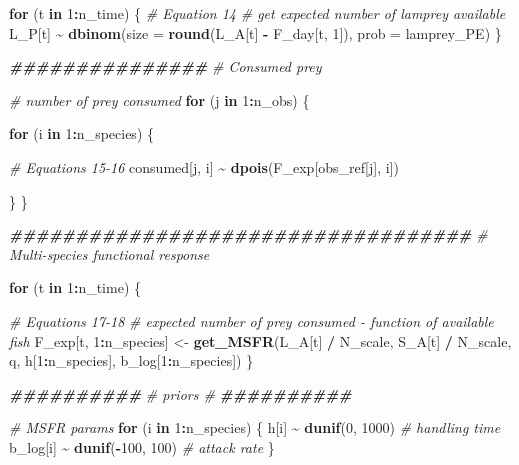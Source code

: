 \documentclass[
]{article}
\newenvironment{Shaded}{\begin{snugshade}}{\end{snugshade}}
\newcommand{\AttributeTok}[1]{\textcolor[rgb]{0.13,0.29,0.53}{#1}}
\newcommand{\CommentTok}[1]{\textcolor[rgb]{0.56,0.35,0.01}{\textit{#1}}}
\newcommand{\ControlFlowTok}[1]{\textcolor[rgb]{0.13,0.29,0.53}{\textbf{#1}}}
\newcommand{\DecValTok}[1]{\textcolor[rgb]{0.00,0.00,0.81}{#1}}
\newcommand{\DocumentationTok}[1]{\textcolor[rgb]{0.56,0.35,0.01}{\textbf{\textit{#1}}}}
\newcommand{\FunctionTok}[1]{\textcolor[rgb]{0.13,0.29,0.53}{\textbf{#1}}}
\newcommand{\NormalTok}[1]{#1}
\newcommand{\OtherTok}[1]{\textcolor[rgb]{0.56,0.35,0.01}{#1}}
\newcommand{\SpecialCharTok}[1]{\textcolor[rgb]{0.81,0.36,0.00}{\textbf{#1}}}
\begin{document}
\begin{Shaded}
\begin{Highlighting}[]
  \ControlFlowTok{for}\NormalTok{ (t }\ControlFlowTok{in} \DecValTok{1}\SpecialCharTok{:}\NormalTok{n\_time) \{}
    \CommentTok{\# Equation 14}
    \CommentTok{\# get expected number of lamprey available }
\NormalTok{    L\_P[t] }\SpecialCharTok{\textasciitilde{}} \FunctionTok{dbinom}\NormalTok{(}\AttributeTok{size =} \FunctionTok{round}\NormalTok{(L\_A[t] }\SpecialCharTok{{-}}\NormalTok{ F\_day[t, }\DecValTok{1}\NormalTok{]), }
                    \AttributeTok{prob =}\NormalTok{ lamprey\_PE)}
\NormalTok{  \}}
  
  \DocumentationTok{\#\#\#\#\#\#\#\#\#\#\#\#\#\#\#}
  \CommentTok{\# Consumed prey}
  
  \CommentTok{\# number of prey consumed}
  \ControlFlowTok{for}\NormalTok{ (j }\ControlFlowTok{in} \DecValTok{1}\SpecialCharTok{:}\NormalTok{n\_obs) \{}
    
    \ControlFlowTok{for}\NormalTok{ (i }\ControlFlowTok{in} \DecValTok{1}\SpecialCharTok{:}\NormalTok{n\_species) \{}
      
      \CommentTok{\# Equations 15{-}16}
\NormalTok{      consumed[j, i] }\SpecialCharTok{\textasciitilde{}} \FunctionTok{dpois}\NormalTok{(F\_exp[obs\_ref[j], i]) }
      
\NormalTok{    \}}
\NormalTok{  \}}
  
  \DocumentationTok{\#\#\#\#\#\#\#\#\#\#\#\#\#\#\#\#\#\#\#\#\#\#\#\#\#\#\#\#\#\#\#\#\#\#\#}
  \CommentTok{\# Multi{-}species functional response}
  
  \ControlFlowTok{for}\NormalTok{ (t }\ControlFlowTok{in} \DecValTok{1}\SpecialCharTok{:}\NormalTok{n\_time) \{}
    
    \CommentTok{\# Equations 17{-}18}
    \CommentTok{\# expected number of prey consumed {-} function of available fish}
\NormalTok{    F\_exp[t, }\DecValTok{1}\SpecialCharTok{:}\NormalTok{n\_species] }\OtherTok{\textless{}{-}} \FunctionTok{get\_MSFR}\NormalTok{(L\_A[t] }\SpecialCharTok{/}\NormalTok{ N\_scale, }
\NormalTok{                                      S\_A[t] }\SpecialCharTok{/}\NormalTok{ N\_scale, }
\NormalTok{                                      q, h[}\DecValTok{1}\SpecialCharTok{:}\NormalTok{n\_species], }
\NormalTok{                                      b\_log[}\DecValTok{1}\SpecialCharTok{:}\NormalTok{n\_species])}
\NormalTok{  \}}
  
  
  \DocumentationTok{\#\#\#\#\#\#\#\#\#\#}
  \CommentTok{\# priors \#}
  \DocumentationTok{\#\#\#\#\#\#\#\#\#\#}
  
  \CommentTok{\# MSFR params}
  \ControlFlowTok{for}\NormalTok{ (i }\ControlFlowTok{in} \DecValTok{1}\SpecialCharTok{:}\NormalTok{n\_species) \{}
\NormalTok{    h[i] }\SpecialCharTok{\textasciitilde{}} \FunctionTok{dunif}\NormalTok{(}\DecValTok{0}\NormalTok{, }\DecValTok{1000}\NormalTok{) }\CommentTok{\# handling time}
\NormalTok{    b\_log[i] }\SpecialCharTok{\textasciitilde{}} \FunctionTok{dunif}\NormalTok{(}\SpecialCharTok{{-}}\DecValTok{100}\NormalTok{, }\DecValTok{100}\NormalTok{) }\CommentTok{\# attack rate}
\NormalTok{  \}}
  

\end{Highlighting}
\end{Shaded}
\end{document}
